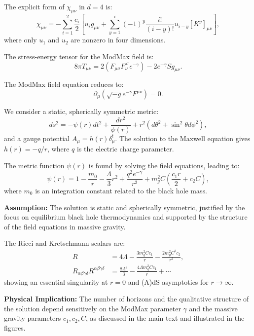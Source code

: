 \documentclass[12pt]{article}
\begin{document}
The explicit form of $\chi_{\mu\nu}$ in $d=4$ is:
\begin{equation}
\chi_{\mu\nu} = -\sum_{i=1}^{2} \frac{c_i}{2} \left[ u_i g_{\mu\nu} + \sum_{y=1}^i (-1)^y \frac{i!}{(i-y)!} u_{i-y} [K^y]_{\mu\nu} \right],
\end{equation}
where only $u_1$ and $u_2$ are nonzero in four dimensions.

The stress-energy tensor for the ModMax field is:
\begin{equation}
8\pi T_{\mu\nu} = 2 (F_{\mu\sigma} F_{\nu}^{\ \sigma} e^{-\gamma}) - 2 e^{-\gamma} S g_{\mu\nu}.
\end{equation}

The ModMax field equation reduces to:
\begin{equation}
\partial_\mu ( \sqrt{-g} e^{-\gamma} F^{\mu\nu} ) = 0.
\end{equation}

We consider a static, spherically symmetric metric:
\begin{equation}
ds^2 = -\psi(r) dt^2 + \frac{dr^2}{\psi(r)} + r^2 (d\theta^2 + \sin^2\theta d\phi^2),
\end{equation}
and a gauge potential $A_\mu = h(r) \delta^t_\mu$. The solution to the Maxwell equation gives $h(r) = -q/r$, where $q$ is the electric charge parameter.

The metric function $\psi(r)$ is found by solving the field equations, leading to:
\begin{equation}
\psi(r) = 1 - \frac{m_0}{r} - \frac{\Lambda}{3} r^2 + \frac{q^2 e^{-\gamma}}{r^2} + m_g^2 C \left( \frac{c_1 r}{2} + c_2 C \right),
\end{equation}
where $m_0$ is an integration constant related to the black hole mass.

\textbf{Assumption:} The solution is static and spherically symmetric, justified by the focus on equilibrium black hole thermodynamics and supported by the structure of the field equations in massive gravity.

The Ricci and Kretschmann scalars are:
\begin{align}
R &= 4\Lambda - \frac{3 m_g^2 C c_1}{r} - \frac{2 m_g^2 C^2 c_2}{r^2}, \\
R_{\alpha\beta\gamma\delta} R^{\alpha\beta\gamma\delta} &= \frac{8\Lambda^2}{3} - \frac{4\Lambda m_g^2 C c_1}{r} + \cdots
\end{align}
showing an essential singularity at $r=0$ and (A)dS asymptotics for $r \to \infty$.

\textbf{Physical Implication:} The number of horizons and the qualitative structure of the solution depend sensitively on the ModMax parameter $\gamma$ and the massive gravity parameters $c_1, c_2, C$, as discussed in the main text and illustrated in the figures.
\end{document}
